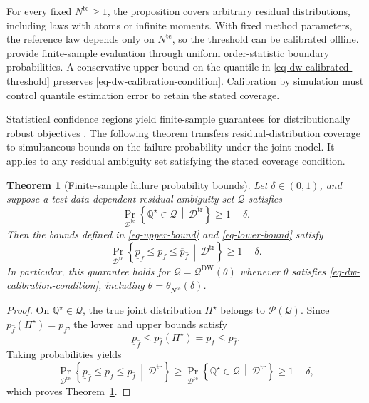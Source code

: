 \documentclass[review,11pt,3p,authoryear,nopreprintline]{elsarticle}
\newtheorem{theorem}{Theorem}
\begin{document}
For every fixed $N^{\mathrm{te}}\ge1$, the proposition covers arbitrary residual distributions, including laws with atoms or infinite moments. With fixed method parameters, the reference law depends only on $N^{\mathrm{te}}$, so the threshold can be calibrated offline. \citet[Supplement, Sections~S.6--S.7]{L.J23} provide finite-sample evaluation through uniform order-statistic boundary probabilities. A conservative upper bound on the quantile in \eqref{eq-dw-calibrated-threshold} preserves \eqref{eq-dw-calibration-condition}. Calibration by simulation must control quantile estimation error to retain the stated coverage.

Statistical confidence regions yield finite-sample guarantees for distributionally robust objectives \citep{B.G.K18}. The following theorem transfers residual-distribution coverage to simultaneous bounds on the failure probability under the joint model. It applies to any residual ambiguity set satisfying the stated coverage condition.

\begin{theorem}[Finite-sample failure probability bounds]
  \label{theorem-01}
  Let $\delta\in(0,1)$, and suppose a test-data-dependent residual ambiguity set $\mathscr Q$ satisfies
  \[
    \Pr_{\mathcal D^{\mathrm{te}}}\left\{\mathbb Q^\star\in\mathscr Q\,\middle|\,\mathcal D^{\mathrm{tr}}\right\}\ge1-\delta.
  \]
  Then the bounds defined in \eqref{eq-upper-bound} and \eqref{eq-lower-bound} satisfy
  \begin{equation}
    \Pr_{\mathcal D^{\mathrm{te}}}\left\{\underline p_{\hat f}\le p_f\le\overline p_{\hat f}\,\middle|\,\mathcal D^{\mathrm{tr}}\right\}\ge1-\delta.
    \label{eq-failure-probability-coverage}
  \end{equation}
  In particular, this guarantee holds for $\mathscr Q=\mathscr Q^{\mathrm{DW}}(\theta)$ whenever $\theta$ satisfies \eqref{eq-dw-calibration-condition}, including $\theta=\theta_{N^{\mathrm{te}}}(\delta)$.
\end{theorem}
\begin{proof}
  On $\mathbb Q^\star\in\mathscr Q$, the true joint distribution $\Pi^\star$ belongs to $\mathscr P(\mathscr Q)$. Since $p_{\hat f}(\Pi^\star)=p_f$, the lower and upper bounds satisfy
  \[
    \underline p_{\hat f}\le p_{\hat f}(\Pi^\star)=p_f\le\overline p_{\hat f}.
  \]
  Taking probabilities yields
  \[
    \Pr_{\mathcal D^{\mathrm{te}}}\left\{\underline p_{\hat f}\le p_f\le\overline p_{\hat f}\,\middle|\,\mathcal D^{\mathrm{tr}}\right\}\ge\Pr_{\mathcal D^{\mathrm{te}}}\left\{\mathbb Q^\star\in\mathscr Q\,\middle|\,\mathcal D^{\mathrm{tr}}\right\}\ge1-\delta,
  \]
  which proves Theorem~\ref{theorem-01}.
\end{proof}
\end{document}
